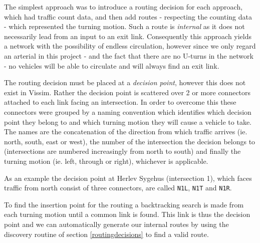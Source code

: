 The simplest approach was to introduce a routing decision for each approach, which had traffic count data, and then add routes - respecting the counting data - which represented the turning motion. Such a route is \textit{internal} as it does not necessarily lead from an input to an exit link. Consequently this approach yields a network with the possibility of endless circulation, however since we only regard an arterial in this project - and the fact that there are no U-turns in the network - no vehicles will be able to circulate and will always find an exit link.

The routing decision must be placed at a \textit{decision point}, however this does not exist in Vissim. Rather the decision point is scattered over 2 or more connectors attached to each link facing an intersection. In order to overcome this these connectors were grouped by a naming convention which identifies which decision point they belong to and which turning motion they will cause a vehicle to take. 
The names are the concatenation of the direction from which traffic arrives (ie. north, south, east or west), the number of the intersection the decision belongs to (intersections are numbered increasingly from north to south) and finally the turning motion (ie. left, through or right), whichever is applicable. 

As an example the decision point at Herlev Sygehus (intersection 1), which faces traffic from north consist of three connectors, are called \verb|N1L|, \verb|N1T| and \verb|N1R|.

To find the insertion point for the routing a backtracking search is made from each turning motion until a common link is found. This link is thus the decision point and we can automatically generate our internal routes by using the discovery routine of section \ref{routingdecisions} to find a valid route.

